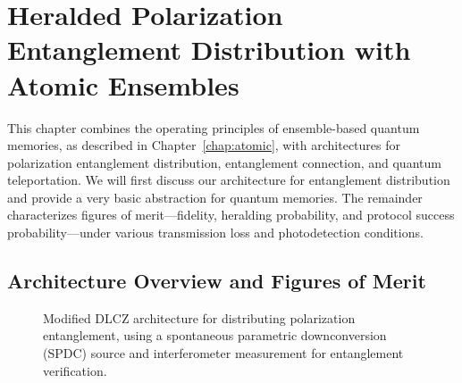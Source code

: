 \documentclass[aps,twocolumn,secnumarabic,amsmath,amssymb,pra,groupedaddress,
showpacs, showkeys]{revtex4-1}
\newcommand{\ket}[1]{\left|#1\right\rangle}
\newcommand{\abs}[1]{\left|#1\right|}
\begin{document}

\section{Heralded Polarization Entanglement Distribution with Atomic
  Ensembles\label{chap:herald}}

This chapter combines the operating principles of ensemble-based quantum
memories, as described in Chapter~\ref{chap:atomic}, with architectures for
polarization entanglement distribution, entanglement connection, and quantum
teleportation. We will first discuss our architecture for entanglement
distribution and provide a very basic abstraction for quantum memories. The
remainder characterizes figures of merit---fidelity, heralding probability, and
protocol success probability---under various transmission loss and
photodetection conditions.

\subsection{Architecture Overview and Figures of Merit\label{sec:herald:overview}}

\begin{figure}[t]
	\centering
	\resizebox{6.50in}{!}{}
	\caption{Modified DLCZ architecture for distributing polarization entanglement, using a spontaneous parametric downconversion (SPDC) source and  interferometer measurement for entanglement verification.}
	\label{fig:channel_model}
\end{figure}
\end{document}
